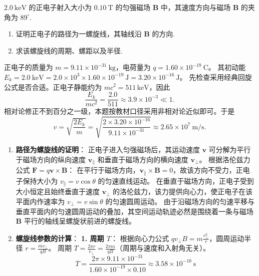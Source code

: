 \begin{exercise}\label{ex:17.9}
$2.0 \ \mathrm{keV}$ 的正电子射入大小为 $0.10 \ \mathrm{T}$ 的匀强磁场 $\boldsymbol{B}$ 中，其速度方向与磁场 $\boldsymbol{B}$ 的夹角为 $89^\circ$. 
\begin{enumerate}
  \item[(a)] 证明正电子的路径为一螺旋线，其轴线沿 $\boldsymbol{B}$ 的方向. 
  \item[(b)] 求该螺旋线的周期、螺距以及半径.
\end{enumerate}
\end{exercise}
\begin{solution}
正电子的质量为 $m = 9.11 \times 10^{-31} \ \mathrm{kg}$，电荷量为 $q = 1.60 \times 10^{-19} \ \mathrm{C}$。
其初动能 $E_k = 2.0 \ \mathrm{keV} = 2.0 \times 10^3 \times 1.60 \times 10^{-19} \ \mathrm{J} = 3.20 \times 10^{-16} \ \mathrm{J}$。
先检查采用经典回旋公式是否合适。正电子静能约为 $m c^2=511\,\mathrm{keV}$，因此
\[
\frac{E_k}{mc^2}=\frac{2.0}{511}\approx3.9\times10^{-3}\ll1.
\]
相对论修正不到百分之一级，本题按教材口径采用非相对论近似即可。于是
$$ v = \sqrt{\frac{2E_k}{m}} = \sqrt{\frac{2 \times 3.20 \times 10^{-16}}{9.11 \times 10^{-31}}} \approx 2.65 \times 10^7 \ \mathrm{m/s}. $$

\begin{enumerate}
    \item[(a)] \textbf{路径为螺旋线的证明}：
    正电子进入匀强磁场后，其运动速度 $\boldsymbol{v}$ 可分解为平行于磁场方向的纵向速度 $\boldsymbol{v}_{\parallel}$ 和垂直于磁场方向的横向速度 $\boldsymbol{v}_{\perp}$。
    根据洛伦兹力公式 $\boldsymbol{F} = q\boldsymbol{v} \times \boldsymbol{B}$：
    在平行于磁场方向，$\boldsymbol{v}_{\parallel} \times \boldsymbol{B} = 0$，故该方向不受力，正电子保持大小为 $v_{\parallel} = v\cos\theta$ 的匀速直线运动。
    在垂直于磁场方向，正电子受到大小恒定且始终垂直于速度 $\boldsymbol{v}_{\perp}$ 的洛伦兹力，该力提供向心力，使正电子在该平面内作速率为 $v_{\perp} = v\sin\theta$ 的匀速圆周运动。
    由于沿磁场方向的匀速平移与垂直平面内的匀速圆周运动的叠加，其空间运动轨迹必然是围绕着一条与磁场 $\boldsymbol{B}$ 平行的轴线呈螺旋状前进的螺旋线。

    \item[(b)] \textbf{螺旋线参数的计算}：
    \textbf{1. 周期 $T$}：
    根据向心力公式 $q v_{\perp} B = m \frac{v_{\perp}^2}{r}$，圆周运动半径 $r = \frac{m v_{\perp}}{qB}$。
    周期 $T = \frac{2\pi r}{v_{\perp}} = \frac{2\pi m}{qB}$（周期与速度和入射角无关）。
    $$ T = \frac{2\pi \times 9.11 \times 10^{-31}}{1.60 \times 10^{-19} \times 0.10} \approx 3.58 \times 10^{-10} \ \mathrm{s} $$
    

\end{enumerate}
\end{solution}
